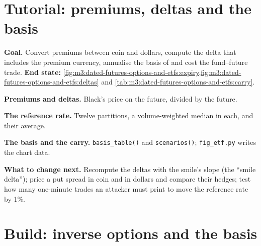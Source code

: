 \section{Tutorial: premiums, deltas and the basis}\label{tut:m3:dated-futures-options-and-etfs:convert}

\begin{tutorial}
\textbf{Goal.} Convert  premiums between coin and dollars, compute the delta that includes the premium currency, annualise
the basis of  and cost the fund--future trade. \textbf{End state:}
\cref{fig:m3:dated-futures-options-and-etfs:expiry,fig:m3:dated-futures-options-and-etfs:deltas} and
\cref{tab:m3:dated-futures-options-and-etfs:carry}.
\begin{tutsteps}
\item \textbf{Premiums and deltas.} Black's price on the future, divided by the future.
\label{lst:m3:dated-futures-options-and-etfs:delta}
\item \textbf{The reference rate.} Twelve partitions, a volume-weighted median in each, and their average.
\label{lst:m3:dated-futures-options-and-etfs:brr}
\item \textbf{The basis and the carry.} \texttt{basis\_table()} and \texttt{scenarios()}; \texttt{fig\_etf.py} writes the chart data.
\end{tutsteps}
\textbf{What to change next.} Recompute the deltas with the smile's slope (the ``smile delta''); price a put spread in coin and in dollars
and compare their hedges; test how many one-minute trades an attacker must print to move the reference rate by 1\%.
\end{tutorial}

\section{Build: inverse options and the basis}\label{bld:m3:dated-futures-options-and-etfs:cryptoopt}


